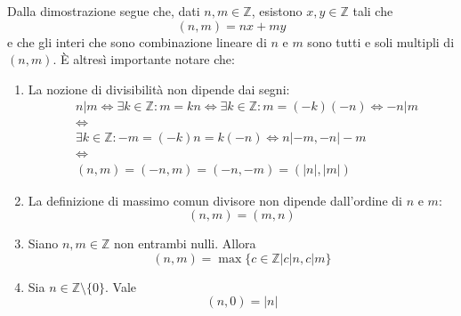 Dalla dimostrazione segue che, dati $n,m\in\mathbb{Z}$, esistono
$x,y\in\mathbb{Z}$ tali che \[ (n,m) = nx + my \]
e che gli interi che sono combinazione lineare di $n$ e $m$ sono       
tutti e soli multipli di $(n,m)$. È altresì importante notare che:
\begin{enumerate}
\item La nozione di divisibilità non dipende dai segni:
\begin{align*}
    &n|m \Longleftrightarrow \exists k\in\mathbb{Z}:m=kn \Longleftrightarrow \exists k\in\mathbb{Z}:m=(-k)(-n) \Longleftrightarrow -n|m\\
    &\Longleftrightarrow\\
    &\exists k\in\mathbb{Z}:-m=(-k)n=k(-n) \Longleftrightarrow n|-m,-n|-m\\
    &\Longleftrightarrow\\
    &(n,m) = (-n,m) = (-n,-m) = (|n|,|m|)
\end{align*}
\item La definizione di massimo comun divisore non dipende dall'ordine
di $n$ e $m$: \[ (n,m)=(m,n) \]
\item Siano $n,m\in\mathbb{Z}$ non entrambi nulli. Allora
\[ (n,m)=\max\{c\in\mathbb{Z}| c|n,c|m\} \]
\item Sia $n\in\mathbb{Z}\setminus\{0\}$. Vale \[ (n,0)=|n| \]
\end{enumerate}



